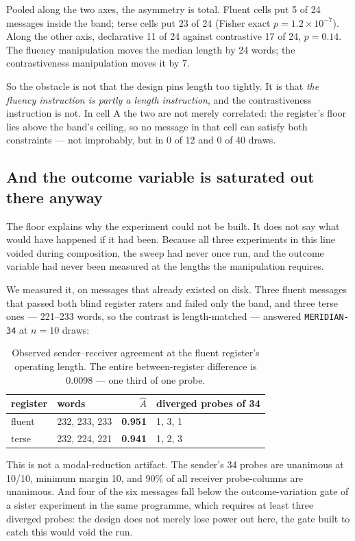 \documentclass[11pt]{article}
\begin{document}
Pooled along the two axes, the asymmetry is total. Fluent cells put 5 of 24
messages inside the band; terse cells put 23 of 24 (Fisher exact
$p = 1.2 \times 10^{-7}$). Along the other axis, declarative 11 of 24 against
contrastive 17 of 24, $p = 0.14$. The fluency manipulation moves the median
length by 24 words; the contrastiveness manipulation moves it by 7.

So the obstacle is not that the design pins length too tightly. It is that
\emph{the fluency instruction is partly a length instruction}, and the
contrastiveness instruction is not. In cell A the two are not merely correlated:
the register's floor lies above the band's ceiling, so no message in that cell
can satisfy both constraints --- not improbably, but in 0 of 12 and 0 of 40
draws.

\subsection{And the outcome variable is saturated out there anyway}
\label{sec:saturation}

The floor explains why the experiment could not be built. It does not say what
would have happened if it had been. Because all three experiments in this line
voided during composition, the sweep had never once run, and the outcome variable
had never been measured at the lengths the manipulation requires.

We measured it, on messages that already existed on disk. Three fluent messages
that passed both blind register raters and failed only the band, and three terse
ones --- 221--233 words, so the contrast is length-matched --- answered
\texttt{MERIDIAN-34} at $n = 10$ draws:

\begin{table}[h]
\centering
\begin{tabular}{llrl}
\toprule
register & words & $\hat{A}$ & diverged probes of 34 \\
\midrule
fluent & 232, 233, 233 & \textbf{0.951} & 1, 3, 1 \\
terse  & 232, 224, 221 & \textbf{0.941} & 1, 2, 3 \\
\bottomrule
\end{tabular}
\caption{Observed sender--receiver agreement at the fluent register's operating
length. The entire between-register difference is 0.0098 --- one third of one
probe.}
\label{tab:saturation}
\end{table}

This is not a modal-reduction artifact. The sender's 34 probes are unanimous at
10/10, minimum margin 10, and 90\% of all receiver probe-columns are unanimous.
And four of the six messages fall below the outcome-variation gate of a sister
experiment in the same programme, which requires at least three diverged probes:
the design does not merely lose power out here, the gate built to catch this
would void the run.
\end{document}

